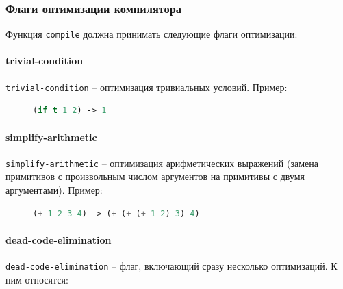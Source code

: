 \subsubsection{Флаги оптимизации компилятора}

Функция \texttt{compile} должна принимать следующие флаги оптимизации:


\paragraph{trivial-condition}

\texttt{trivial-condition} -- оптимизация тривиальных условий. Пример:
\begin{figure}[H]
\begin{lstlisting}[language=Lisp]
(if t 1 2) -> 1
\end{lstlisting}
\end{figure}


\paragraph{simplify-arithmetic}

\texttt{simplify-arithmetic} -- оптимизация арифметических выражений (замена примитивов с произвольным числом аргументов на примитивы с двумя аргументами). Пример:
\begin{figure}[H]
\begin{lstlisting}[language=Lisp]
(+ 1 2 3 4) -> (+ (+ (+ 1 2) 3) 4)
\end{lstlisting}
\end{figure}


\paragraph{dead-code-elimination}

\texttt{dead-code-elimination} -- флаг, включающий сразу несколько оптимизаций. К ним относятся:

